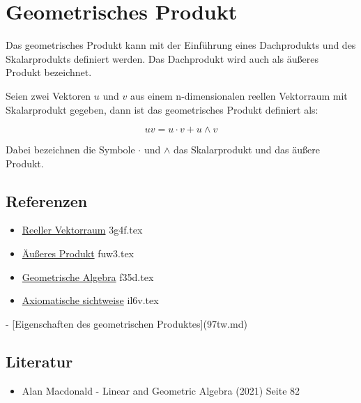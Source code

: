 \documentclass{sajzk}
\begin{document}
\section{Geometrisches Produkt}
\label{81js}

Das geometrisches Produkt kann mit der Einführung eines Dachprodukts und des 
Skalarprodukts definiert werden. Das Dachprodukt wird auch als äußeres
Produkt bezeichnet.

Seien zwei Vektoren $u$ und $v$ aus einem n-dimensionalen reellen Vektorraum mit
Skalarprodukt gegeben, dann ist das geometrisches Produkt definiert als:

$$
uv = u \cdot v + u \wedge v
$$

Dabei bezeichnen die Symbole $\cdot$ und $\wedge$ das Skalarprodukt und das
äußere Produkt.

\subsection{Referenzen}

\begin{itemize}
    \item \href{3g4f.pdf}{Reeller Vektorraum} 3g4f.tex
    \item \href{fuw3.pdf}{Äußeres Produkt} fuw3.tex
    \item \href{f35d.pdf}{Geometrische Algebra} f35d.tex
    \item \href{il6v.pdf}{Axiomatische sichtweise} il6v.tex
\end{itemize}

- [Eigenschaften des geometrischen Produktes](97tw.md)

\subsection{Literatur}
\begin{itemize}
    \item Alan Macdonald - Linear and Geometric Algebra (2021) Seite 82
\end{itemize}
\end{document}
